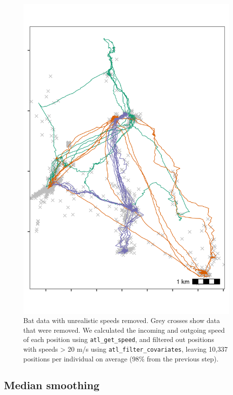 \documentclass[]{scrartcl}
\begin{document}
\begin{figure}
\centering
\includegraphics{figures/fig_bat_filter_speed.png}
\caption{Bat data with unrealistic speeds removed. Grey crosses show data that were removed. We calculated the incoming and outgoing speed of each position using \texttt{atl\_get\_speed}, and filtered out positions with speeds \textgreater{} 20 m/s using \texttt{atl\_filter\_covariates}, leaving 10,337 positions per individual on average (98\% from the previous step).}
\end{figure}

\hypertarget{median-smoothing}{%
\subsection{Median smoothing}\label{median-smoothing}}
\end{document}
